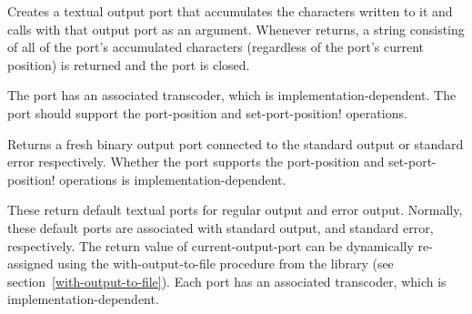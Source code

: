 \begin{entry}{%
}

Creates a textual output port that accumulates the
characters written to it and calls  with that output port
as an argument.  Whenever  returns, a string consisting of all
of the port's accumulated characters (regardless of the port's current
position) is returned and the port is closed.

The port has an associated transcoder, which is implementation-dependent.
The port should support
the {\cf port-position} and {\cf set-port-position!} operations.
\end{entry}

\begin{entry}{%
}
   
Returns a fresh binary output port connected to the standard output or
standard error respectively.  Whether the port supports the {\cf
  port-position} and {\cf set-port-position!} operations is
implementation-dependent.
\end{entry}

\begin{entry}{%
}
 
These return default textual ports for regular output and error output.
Normally, these default ports are associated with standard output, and
standard error, respectively.  The return value of {\cf
  current-output-port} can be dynamically re-assigned using the {\cf
  with-output-to-file} procedure from the 
library (see section~\ref{with-output-to-file}).
Each port has an associated transcoder, which is implementation-dependent.
\end{entry}


